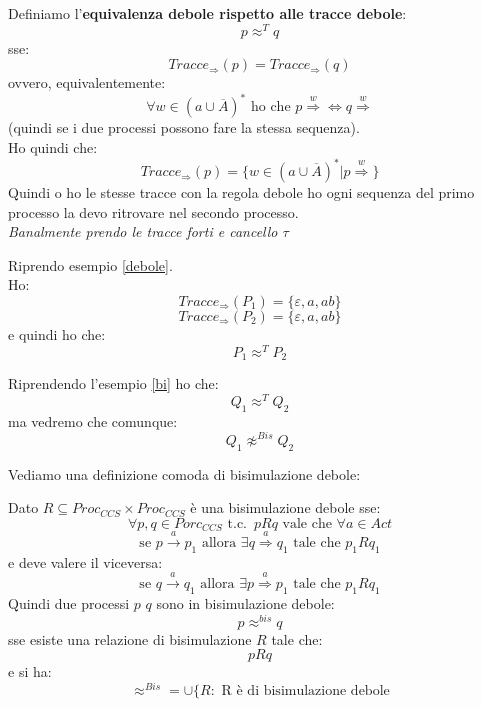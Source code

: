 \documentclass[a4paper,12pt, oneside]{book}
\begin{document}
\begin{definizione}
  Definiamo l'\textbf{equivalenza debole rispetto alle tracce debole}:
  \[p\approx^T q\]
  sse:
  \[Tracce_{\Rightarrow}(p)=Tracce_{\Rightarrow}(q)\]
  ovvero, equivalentemente:
  \[\forall w\in(a\cup \overline{A})^*\mbox{ ho che }p\stackrel{w}{\Rightarrow}
    \iff q\stackrel{w}{\Rightarrow}\]
  (quindi se i due processi possono fare la stessa sequenza).\\
  Ho quindi che:
  \[Tracce_{\Rightarrow}(p)=\{w\in(a\cup \overline{A})^*|
    p\stackrel{w}{\Rightarrow}\}\]
  Quindi o ho le stesse tracce con la regola debole ho ogni sequenza del primo
  processo la devo ritrovare nel secondo processo.\\
  \textit{Banalmente prendo le tracce forti e cancello $\tau$}
\end{definizione}
\begin{esempio}
  Riprendo esempio \ref{debole}.\\
  Ho:
  \[Tracce_{\Rightarrow}(P_1)=\{\varepsilon,a,ab\}\]
  \[Tracce_{\Rightarrow}(P_2)=\{\varepsilon,a,ab\}\]
  e quindi ho che:
  \[P_1\approx^T P_2\]
\end{esempio}
\begin{esempio}
  Riprendendo l'esempio \ref{bi} ho che:
  \[Q_1\approx^T Q_2\]
  ma vedremo che comunque:
  \[Q_1\not\approx^{Bis} Q_2\]
\end{esempio}
Vediamo una definizione comoda di bisimulazione debole:
\begin{definizione}
  Dato $R\subseteq Proc_{CCS}\times Proc_{CCS}$ è una bisimulazione debole sse:
  \[\forall p,q\in Porc_{CCS}\mbox{ t.c. }\,pRq \mbox{ vale che } \forall a\in
    Act\] 
  \[\mbox{se }p\stackrel{a}{\rightarrow}p_1\mbox{ allora }\exists
    q\stackrel{a}{\Rightarrow}q_1 \mbox{ tale che } p_1Rq_1\]
  e deve valere il viceversa:
  \[\mbox{se }q\stackrel{a}{\rightarrow}q_1\mbox{ allora }\exists
    p\stackrel{a}{\Rightarrow}p_1 \mbox{ tale che } p_1Rq_1\]
  Quindi due processi $p$ $q$ sono in bisimulazione debole:
  \[p\approx^{bis} q\] sse esiste una relazione di bisimulazione $R$ tale che:
  \[pRq\]
  e si ha:
  \[\approx^{Bis}=\cup\{R:\mbox{ R è di bisimulazione debole}\]
\end{definizione}
\end{document}
